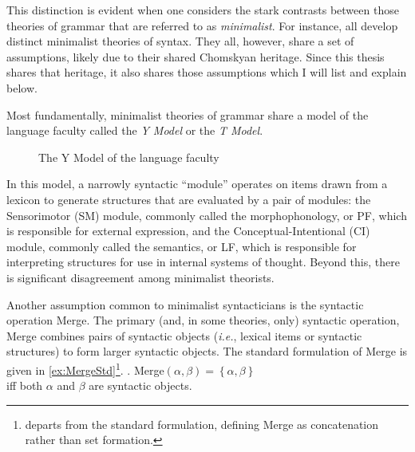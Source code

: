 \documentclass[MilwayThesis]{subfiles}
\begin{document}
This distinction is evident when one considers the stark contrasts between those theories of grammar that are referred to as \textit{minimalist}.
For instance, \textcite{chomsky2000minimalist,hornstein2009theory,frampton2008crash,epstein2006derivations,borer2005name,borer2005normal,borer2013taking} all develop distinct minimalist theories of syntax.
They all, however, share a set of assumptions, likely due to their shared Chomskyan heritage.
Since this thesis shares that heritage, it also shares those assumptions which I will list and explain below.

Most fundamentally, minimalist theories of grammar share a model of the language faculty called the \textit{Y Model} or the \textit{T Model}.
\begin{figure}[h]
	\centering
	\caption{The Y Model of the language faculty}
	\label{fig:YModel}
\end{figure}
In this model, a narrowly syntactic ``module'' operates on items drawn from a lexicon to generate structures that are evaluated by a pair of modules:
the Sensorimotor (SM) module, commonly called the morphophonology, or PF, which is responsible for external expression, and the Conceptual-Intentional (CI) module, commonly called the semantics, or LF, which is responsible for interpreting structures for use in internal systems of thought.
Beyond this, there is significant disagreement among minimalist theorists.

Another assumption common to minimalist syntacticians is the syntactic operation Merge.
The primary (and, in some theories, only) syntactic operation, Merge combines pairs of syntactic objects (\textit{i.e.}, lexical items or syntactic structures) to form larger syntactic objects.
The standard formulation of Merge is given in \cref{ex:MergeStd}\footnote{
	\textcite{hornstein2009theory} departs from the standard formulation, defining Merge as concatenation rather than set formation.
}.
\ex.\label{ex:MergeStd} Merge$(\alpha, \beta) = \left\{ \alpha, \beta \right\}$\\
iff both $\alpha$ and $\beta$ are syntactic objects.
\end{document}
